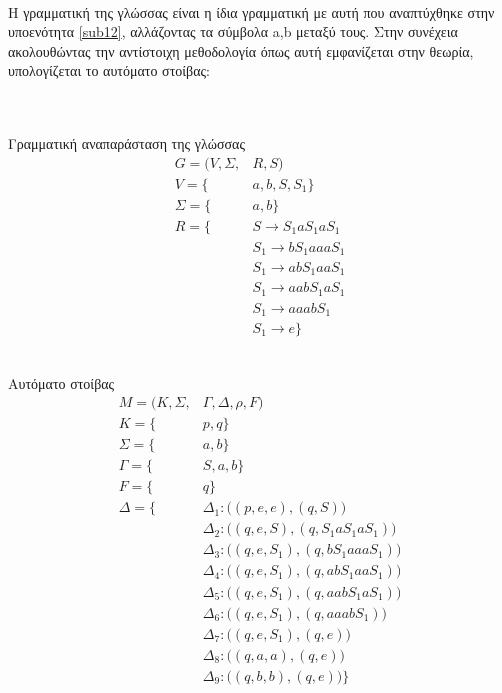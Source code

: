 \noindent\\
Η γραμματική της γλώσσας είναι η ίδια γραμματική με αυτή που αναπτύχθηκε στην υποενότητα \ref{sub12}, αλλάζοντας τα σύμβολα a,b μεταξύ τους. Στην συνέχεια ακολουθώντας την αντίστοιχη μεθοδολογία όπως αυτή εμφανίζεται στην θεωρία, υπολογίζεται το αυτόματο στοίβας:\\\\
\begin{minipage}{0.49\textwidth}
	\noindent\\
	\centering
	Γραμματική αναπαράσταση της γλώσσας 
	\begin{align*}
		G = (V, Σ, &R, S)\\
			   V  = \{&a, b, S, S_1\}\\
				Σ = \{&a, b\}\\
				R = \{&S \xrightarrow{} S_1 a S_1 a S_1\\
						 &S_1 \xrightarrow{} bS_1aaa S_1\\
					 	 &S_1 \xrightarrow{} abS_1aa S_1\\
						 &S_1 \xrightarrow{} aabS_1a S_1\\
						 &S_1 \xrightarrow{} aaab S_1\\
						 &S_1 \xrightarrow{} e \}
	\end{align*}
	\vspace{2.4cm}
\end{minipage}
\begin{minipage}{0.49\textwidth}
	\noindent\\
	\centering
	Αυτόματο στοίβας
	\begin{align*}
		Μ = (Κ, Σ, &Γ, Δ, ρ, F)\\
			   K  = \{&p, q\}\\
			   Σ = \{&a, b\}\\
		       Γ = \{&S, a, b\}\\
		       F = \{&q\}\\
		       Δ = \{& Δ_1 : \big(  (p, e, e), (q, S) \big)\\
		      			& Δ_2 : \big(  (q, e, S), (q, S_1aS_1aS_1) \big)\\
	      				& Δ_3 : \big(  (q, e, S_1), (q, bS_1aaaS_1) \big)\\
	      				& Δ_4 : \big(  (q, e, S_1), (q, abS_1aaS_1) \big)\\
	      				& Δ_5 : \big(  (q, e, S_1), (q, aabS_1aS_1) \big)\\
	      				& Δ_6 : \big(  (q, e, S_1), (q, aaabS_1) \big)\\
	      				& Δ_7 : \big(  (q, e, S_1), (q, e) \big)\\
	      				& Δ_8 : \big(  (q, a, a), (q, e) \big)\\
	      				& Δ_9 : \big(  (q, b, b), (q, e) \big)\}
	\end{align*}
\end{minipage}

